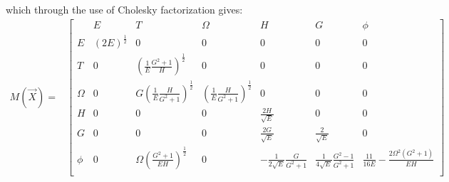which through the use of Cholesky factorization gives:
\begin{align} M(\vec{X}) =
&  \left[\begin{array}{c||ccccc|c}
           & E                      & T                                                     & \Omega                                                 &  H                                   & G                                     & \phi                                                    \\                                   
\hline    \hline                                                                                                                                                                                                                                                                                
E          & (2E)^{\frac{1}{2}}    & 0                                                      & 0                                                      &  0                                   & 0                                     & 0                                                       \\
T          & 0                     & \left(\frac{1}{E}\frac{G^2+1}{H}\right)^{\frac{1}{2}}  & 0                                                      &  0                                   & 0                                     & 0                                                       \\
\Omega     & 0                     & G\left(\frac{1}{E}\frac{H}{G^2+1}\right)^{\frac{1}{2}} & \left(\frac{1}{E}\frac{H}{G^2+1}\right)^{\frac{1}{2}}  &  0                                   & 0                                     & 0                                                       \\ 
H          & 0                     & 0                                                      & 0                                                      &  \frac{2H}{\sqrt{E}}                 & 0                                     & 0                                                       \\
G          & 0                     & 0                                                      & 0                                                      &  \frac{2G}{\sqrt{E}}                 & \frac{2}{\sqrt{E}}                    & 0                                                       \\
\hline                                                                                                                                                                                                                                                                                                               
\phi       & 0                     & \Omega\left(\frac{G^2+1}{EH}\right)^{\frac{1}{2}}      & 0                                                      &  -\frac{1}{2\sqrt{E}}\frac{G}{G^2+1} & \frac{1}{4\sqrt{E}}\frac{G^2-1}{G^2+1} & \frac{11}{16 E} - \frac{2 \Omega^2 (G^2+1)}{EH}  \\ 
\end{array}\right]
 \end{align}
